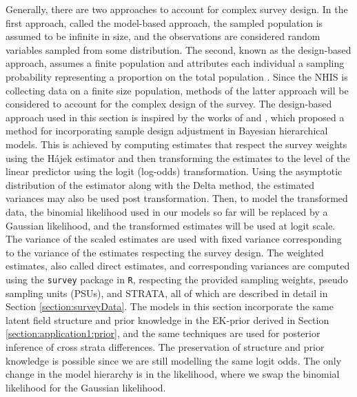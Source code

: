 Generally, there are two approaches to account for complex survey design. In the first approach, called the model-based approach, the sampled population is assumed to be infinite in size, and the observations are considered random variables sampled from some distribution. The second, known as the design-based approach, assumes a finite population and attributes each individual a sampling probability representing a proportion on the total population \citep{fuglstad2021two}. Since the NHIS is collecting data on a finite size population, methods of the latter approach will be considered to account for the complex design of the survey. The design-based approach used in this section is inspired by the works of \cite{SurveyDesignMercer} and \cite{hajekVariance}, which proposed a method for incorporating sample design adjustment in Bayesian hierarchical models. This is achieved by computing estimates that respect the survey weights using the Hájek estimator \citep{hajek1971comment} and then transforming the estimates to the level of the linear predictor using the logit (log-odds) transformation. Using the asymptotic distribution of the estimator along with the Delta method, the estimated variances may also be used post transformation. Then, to model the transformed data, the binomial likelihood used in our models so far will be replaced by a Gaussian likelihood, and the transformed estimates will be used at logit scale. The variance of the scaled estimates are used with fixed variance corresponding to the variance of the estimates respecting the survey design. The weighted estimates, also called direct estimates, and corresponding variances are computed using the \texttt{survey} package \citep{Rsurvey} in \texttt{R}, respecting the provided sampling weights, pseudo sampling units (PSUs), and STRATA, all of which are described in detail in Section \ref{section:surveyData}. The models in this section incorporate the same latent field structure and prior knowledge in the EK-prior derived in Section \ref{section:application1:prior}, and the same techniques are used for posterior inference of cross strata differences. The preservation of structure and prior knowledge is possible since we are still modelling the same logit odds. The only change in the model hierarchy is in the likelihood, where we swap the binomial likelihood for the Gaussian likelihood. 

